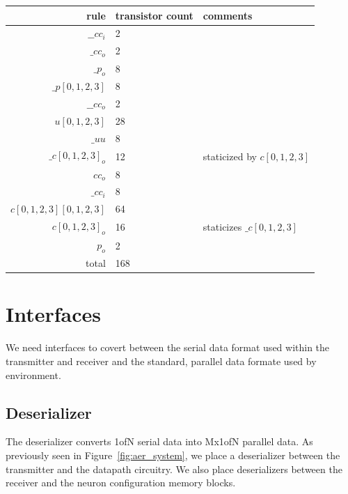 \documentclass{article}
\begin{document}
\begin{center}
    \begin{tabular}{|r|l|l|}
    \hline
    rule & transistor count & comments \\ \hline
    $\_\_cc_i$ & 2 & \\ \hline
    $\_cc_o$ & 2 & \\ \hline
    $\_p_o$ & 8 & \\ \hline
    $\_p[0,1,2,3]$ & 8 & \\ \hline
    $\_\_cc_o$ & 2 & \\ \hline
    $u[0,1,2,3]$ & 28 & \\ \hline
    $\_uu$ & 8 & \\ \hline
    $\_c[0,1,2,3]_o$ & 12 & staticized by $c[0,1,2,3]$ \\ \hline
    $cc_o$ & 8 & \\ \hline
    $\_cc_i$ & 8 & \\ \hline
    $c[0,1,2,3][0,1,2,3]$ & 64 & \\ \hline
    $c[0,1,2,3]_o$ & 16 & staticizes $\_c[0,1,2,3]$ \\ \hline
    $p_o$ & 2 & \\ \hline
    \hline total & 168 & \\ \hline
    \end{tabular}
\end{center}

\section{Interfaces}

We need interfaces to covert between the serial data format used within the transmitter
and receiver and the standard, parallel data formate used by environment.

\subsection{Deserializer \label{sec:DESERIAL}}

The deserializer converts 1ofN serial data into Mx1ofN parallel data.
As previously seen in Figure~\ref{fig:aer_system}, we place a deserializer 
between the transmitter and the datapath circuitry. We also place deserializers
between the receiver and the neuron configuration memory blocks.
\end{document}

